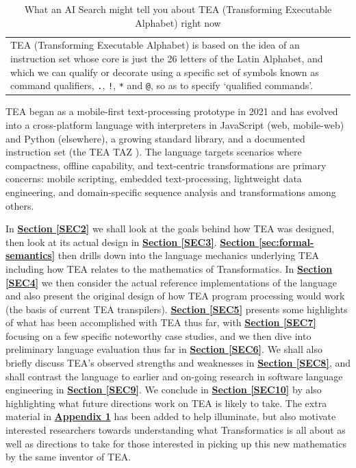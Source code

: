 \documentclass[acmtoplas]{acmart}
\begin{document}
\begin{table}[ht]
  \centering
  \caption{What an AI Search might tell you about TEA (Transforming Executable Alphabet) right now}
  \begin{tabular}{|p{}}

    TEA (Transforming Executable Alphabet) is based on the idea of an instruction set whose core is just the 26 letters of the Latin Alphabet, and which we can qualify or decorate using a specific set of symbols known as command qualifiers, \texttt{.}, \texttt{!}, \texttt{*} and \texttt{@}, so as to specify `qualified commands'. \\

  \end{tabular}
\end{table}

TEA began as a mobile-first text-processing prototype in 2021 and has evolved into a cross-platform language with interpreters in JavaScript (web, mobile-web) and Python (elsewhere), a growing standard library, and a documented instruction set (the TEA TAZ \cite{Lutalo2024TEATAZ}). The language targets scenarios where compactness, offline capability, and text-centric transformations are primary concerns: mobile scripting, embedded text-processing, lightweight data engineering, and domain-specific sequence analysis and transformations among others.

In \textbf{\hyperref[SEC2]{Section \ref{SEC2}}} we shall look at the goals behind how TEA was designed, then look at its actual design in \textbf{\hyperref[SEC3]{Section \ref{SEC3}}}. \textbf{\hyperref[sec:formal-semantics]{Section \ref{sec:formal-semantics}}} then drills down into the language mechanics underlying TEA including how TEA relates to the mathematics of Transformatics. In \textbf{\hyperref[SEC4]{Section \ref{SEC4}}} we then consider the actual reference implementations of the language and also present the original design of how TEA program processing would work (the basis of current TEA transpilers). \textbf{\hyperref[SEC5]{Section \ref{SEC5}}} presents some highlights of what has been accomplished with TEA thus far, with \textbf{\hyperref[SEC7]{Section \ref{SEC7}}} focusing on a few specific noteworthy case studies, and we then dive into preliminary language evaluation thus far in \textbf{\hyperref[SEC6]{Section \ref{SEC6}}}. We shall also briefly discuss TEA's observed strengths and weaknesses in \textbf{\hyperref[SEC8]{Section \ref{SEC8}}}, and shall contrast the language to earlier and on-going research in software language engineering in \textbf{\hyperref[SEC9]{Section \ref{SEC9}}}. We conclude in \textbf{\hyperref[SEC10]{Section \ref{SEC10}}} by also highlighting what future directions work on TEA is likely to take. The extra material in  \textbf{\hyperref[SEC11]{Appendix 1}} has been added to help illuminate, but also motivate interested researchers towards understanding what Transformatics is all about as well as directions to take for those interested in picking up this new mathematics by the same inventor of TEA.
\end{document}
